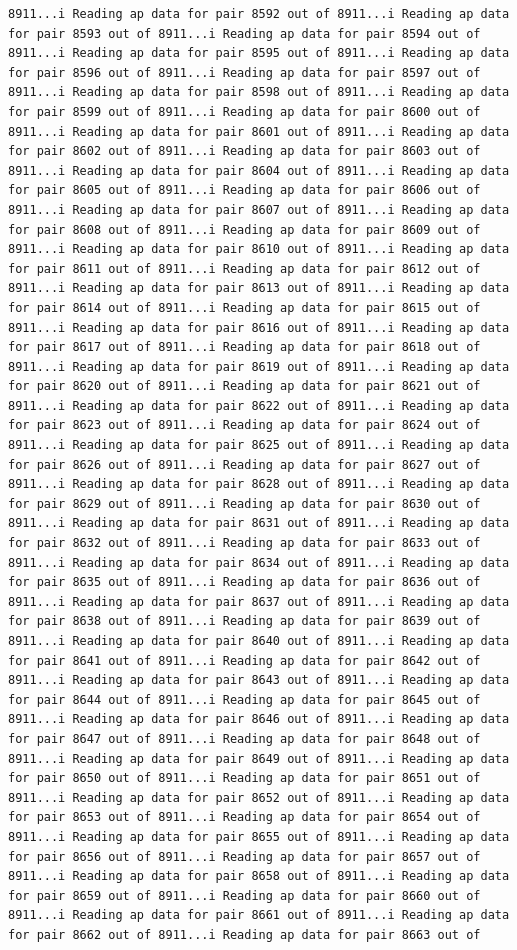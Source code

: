 \documentclass[
]{article}
\begin{document}
\begin{verbatim}
8911...i Reading ap data for pair 8592 out of 8911...i Reading ap data for pair 8593 out of 8911...i Reading ap data for pair 8594 out of 8911...i Reading ap data for pair 8595 out of 8911...i Reading ap data for pair 8596 out of 8911...i Reading ap data for pair 8597 out of 8911...i Reading ap data for pair 8598 out of 8911...i Reading ap data for pair 8599 out of 8911...i Reading ap data for pair 8600 out of 8911...i Reading ap data for pair 8601 out of 8911...i Reading ap data for pair 8602 out of 8911...i Reading ap data for pair 8603 out of 8911...i Reading ap data for pair 8604 out of 8911...i Reading ap data for pair 8605 out of 8911...i Reading ap data for pair 8606 out of 8911...i Reading ap data for pair 8607 out of 8911...i Reading ap data for pair 8608 out of 8911...i Reading ap data for pair 8609 out of 8911...i Reading ap data for pair 8610 out of 8911...i Reading ap data for pair 8611 out of 8911...i Reading ap data for pair 8612 out of 8911...i Reading ap data for pair 8613 out of 8911...i Reading ap data for pair 8614 out of 8911...i Reading ap data for pair 8615 out of 8911...i Reading ap data for pair 8616 out of 8911...i Reading ap data for pair 8617 out of 8911...i Reading ap data for pair 8618 out of 8911...i Reading ap data for pair 8619 out of 8911...i Reading ap data for pair 8620 out of 8911...i Reading ap data for pair 8621 out of 8911...i Reading ap data for pair 8622 out of 8911...i Reading ap data for pair 8623 out of 8911...i Reading ap data for pair 8624 out of 8911...i Reading ap data for pair 8625 out of 8911...i Reading ap data for pair 8626 out of 8911...i Reading ap data for pair 8627 out of 8911...i Reading ap data for pair 8628 out of 8911...i Reading ap data for pair 8629 out of 8911...i Reading ap data for pair 8630 out of 8911...i Reading ap data for pair 8631 out of 8911...i Reading ap data for pair 8632 out of 8911...i Reading ap data for pair 8633 out of 8911...i Reading ap data for pair 8634 out of 8911...i Reading ap data for pair 8635 out of 8911...i Reading ap data for pair 8636 out of 8911...i Reading ap data for pair 8637 out of 8911...i Reading ap data for pair 8638 out of 8911...i Reading ap data for pair 8639 out of 8911...i Reading ap data for pair 8640 out of 8911...i Reading ap data for pair 8641 out of 8911...i Reading ap data for pair 8642 out of 8911...i Reading ap data for pair 8643 out of 8911...i Reading ap data for pair 8644 out of 8911...i Reading ap data for pair 8645 out of 8911...i Reading ap data for pair 8646 out of 8911...i Reading ap data for pair 8647 out of 8911...i Reading ap data for pair 8648 out of 8911...i Reading ap data for pair 8649 out of 8911...i Reading ap data for pair 8650 out of 8911...i Reading ap data for pair 8651 out of 8911...i Reading ap data for pair 8652 out of 8911...i Reading ap data for pair 8653 out of 8911...i Reading ap data for pair 8654 out of 8911...i Reading ap data for pair 8655 out of 8911...i Reading ap data for pair 8656 out of 8911...i Reading ap data for pair 8657 out of 8911...i Reading ap data for pair 8658 out of 8911...i Reading ap data for pair 8659 out of 8911...i Reading ap data for pair 8660 out of 8911...i Reading ap data for pair 8661 out of 8911...i Reading ap data for pair 8662 out of 8911...i Reading ap data for pair 8663 out of 
\end{verbatim}
\end{document}
